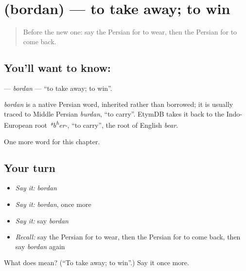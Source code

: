 \section[\texorpdfstring{\fa{بردن} (bordan)}{بردن (bordan)}]{ (bordan) — to take away; to win}

\label{lesson:FA-C39-bordan}



\begin{quote}
Before the new one: say the Persian for to wear, then the Persian for to come back.
\end{quote}

\subsection*{You'll want to know: }
\textbf{} — \emph{bordan} — \textquotedblleft{}to take away; to win\textquotedblright{}.

\begin{cousinweb}
\emph{bordan} is a native Persian word, inherited rather than borrowed; it is usually traced to Middle Persian \emph{burdan}, \textquotedblleft{}to carry\textquotedblright{}. EtymDB takes it back to the Indo-European root \emph{*b\textsuperscript{h}er-}, \textquotedblleft{}to carry\textquotedblright{}, the root of English \emph{bear}.
\end{cousinweb}

\begin{grammarlens}[title={What you've built}]
One more word for this chapter.
\end{grammarlens}

\subsection*{Your turn}
\begin{itemize}
\raggedright
  \item \emph{Say it:} \emph{bordan}
  \item \emph{Say it:} \emph{bordan}, once more
  \item \emph{Say it:} say \emph{bordan}
  \item \emph{Recall:} say the Persian for to wear, then the Persian for to come back, then say \emph{bordan} again
\end{itemize}

\begin{tcolorbox}[breakable,colback=teal!4,colframe=teal!35!black,title={Before you move on}]
What does  mean? (\textquotedblleft{}To take away; to win\textquotedblright{}.) Say it once more.
\end{tcolorbox}
